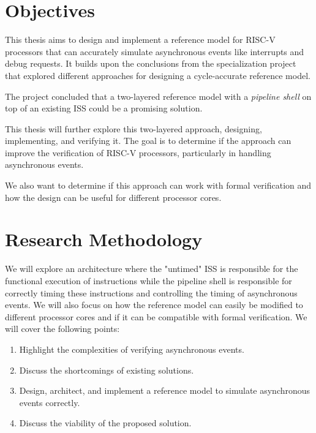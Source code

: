 \section{Objectives}




This thesis aims to design and implement a reference model for RISC-V processors that can accurately simulate asynchronous events like interrupts and debug requests. It builds upon the conclusions from the specialization project \cite{torjenygaardeikenesDesigningRISCVReference2023} that explored different approaches for designing a cycle-accurate reference model. 

The project concluded that a two-layered reference model with a \textit{pipeline shell} on top of an existing ISS could be a promising solution. 

This thesis will further explore this two-layered approach, designing, implementing, and verifying it. The goal is to determine if the approach can improve the verification of RISC-V processors, particularly in handling asynchronous events. 

We also want to determine if this approach can work with formal verification and how the design can be useful for different processor cores.


\section{Research Methodology}

We will explore an architecture where the "untimed" ISS is responsible for the functional execution of instructions while the pipeline shell is responsible for correctly timing these instructions and controlling the timing of asynchronous events. We will also focus on how the reference model can easily be modified to different processor cores and if it can be compatible with formal verification.  
We will cover the following points:

\begin{enumerate}
    \item Highlight the complexities of verifying asynchronous events. 
    \item Discuss the shortcomings of existing solutions.
    \item Design, architect, and implement a reference model to simulate asynchronous events correctly.
    \item Discuss the viability of the proposed solution.
\end{enumerate}

